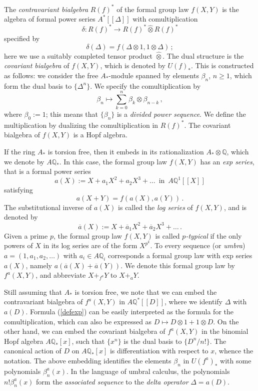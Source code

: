 \documentclass[a4paper,12pt]{amsart}
\theoremstyle{definition}
\numberwithin{equation}{section}
\newcommand{\bQ}{{\mathbb Q}}
\newcommand{\spa}{\;\:}
\begin{document}
The {\em contravariant bialgebra} $R(f)^*$ of the formal group law $f(X,Y)$ is the algebra of formal power series $A^*[[\varDelta]]$ with comultiplication
\[
\delta\colon R(f)^*\rightarrow R(f)^*\widehat{\otimes} R(f)^*
\]
specified by
\[ \delta(\varDelta)=f(\varDelta\otimes 1,1\otimes\varDelta)\,;\]
here we use a suitably completed tensor product $\widehat{\otimes}$. The dual structure is the {\em covariant bialgebra} of $f(X,Y)$, which is denoted by $U(f)_*$. This is constructed as follows: we consider the free $A_*$-module spanned by elements $\beta_n$, $n\ge 1$, which form the dual basis to $\{\varDelta^n\}$. We specify the comultiplication by
\[\beta_n\mapsto\sum_{k=0}^n\beta_k\otimes\beta_{n-k}\,,\]
where $\beta_0:=1$; this means that $\{\beta_n\}$ is a {\em divided power sequence}. We define the multiplication by dualizing the comultiplication in $R(f)^*$. The covariant bialgebra of $f(X,Y)$ is a Hopf algebra. 

If the ring $A_*$ is torsion free, then it embeds in its rationalization $A_*\otimes\bQ$, which we denote by $A\bQ_*$. In this case, the formal group law $f(X,Y)$ has an {\em exp series}, that is a formal power series 
\[a(X):=X+a_1 X^2+a_2 X^3+\ldots\spa\mbox{in}\spa A\bQ^1[[X]]\]
satisfying 
\begin{equation}\label{defexp}
a(X+Y)=f(a(X),a(Y))\,.
\end{equation}
The substitutional inverse of $a(X)$ is called the {\em log series} of $f(X,Y)$, and is denoted by 
\[\overline{a}(X):=X+\overline{a}_1 X^2+\overline{a}_2 X^3+\ldots\,.\]
Given a prime $p$, the formal group law $f(X,Y)$ is called {\em $p$-typical} if the only powers of $X$ in its log series are of the form $X^{p^k}$. To every sequence (or {\em umbra}) $a=(1,a_1,a_2,\ldots)$ with $a_i\in A\bQ_i$ corresponds a formal group law with exp series $a(X)$, namely $a(\overline{a}(X)+\overline{a}(Y))$. We denote this formal group law by $f^a(X,Y)$, and abbreviate $X+_{f^a}Y$ to $X+_a Y$.

Still assuming that $A_*$ is torsion free, we note that we can embed the contravariant bialgebra of $f^a(X,Y)$ in $A\bQ^*[[D]]$, where we identify $\varDelta$ with $a(D)$. Formula (\ref{defexp}) can be easily interpreted as the formula for the comultiplication, which can also be expressed as $D\mapsto D\otimes 1+1\otimes D$. On the other hand, we can embed the covariant bialgebra of $f^a(X,Y)$ in the binomial Hopf algebra $A\bQ_*[x]$, such that $\{x^n\}$ is the dual basis to $\{D^n/n!\}$. The canonical action of $D$ on $A\bQ_*[x]$ is differentiation with respect to $x$, whence the notation. The above embedding identifies the elements $\beta_n$ in $U(f^a)_*$ with some polynomials $\beta_n^a(x)$. In the language of umbral calculus, the polynomials $n!\beta_n^a(x)$ form the {\em associated sequence} to the {\em delta operator} $\varDelta=a(D)$. 
\end{document}
